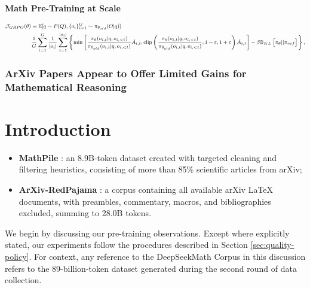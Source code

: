 \textbf{Math Pre-Training at Scale}

\begin{equation}
\footnotesize
\begin{split}
    \mathcal{J}_{GRPO}(\theta) &= \mathbb{E}{[q \sim P(Q), \{o_i\}_{i=1}^G \sim \pi_{\theta_{old}}(O|q)]}  \\
    & \frac{1}{G}\sum_{i=1}^G\frac{1}{|o_i|} \sum_{t=1}^{|o_i|} \left\{ \min \left[ \frac{\pi_\theta(o_{i,t} | q, o_{i,<t})}{\pi_{\theta_{old}}(o_{i,t} | q, o_{i,<t})} \hat{A}_{i,t}, \text{clip} \left( \frac{\pi_\theta(o_{i,t} | q, o_{i,<t})}{\pi_{\theta_{old}}(o_{i,t} | q, o_{i,<t})}, 1 - \varepsilon, 1 + \varepsilon \right)  \hat{A}_{i,t} \right] - \beta \mathbb{D}_{KL}\left[\pi_{\theta} || \pi_{ref}\right]\right\} ,
\end{split}
\label{eq:GRPO-obj}
\end{equation}

\subsubsection{ArXiv Papers Appear to Offer Limited Gains for Mathematical Reasoning}

\section{Introduction}

\begin{itemize}[topsep=0pt]
    \item \textbf{MathPile} \citep{mathpile}: an 8.9B-token dataset created with targeted cleaning and filtering heuristics, consisting of more than 85\% scientific articles from arXiv;
    \item \textbf{ArXiv-RedPajama} \citep{redpajama}: a corpus containing all available arXiv LaTeX documents, with preambles, commentary, macros, and bibliographies excluded, summing to 28.0B tokens.
\end{itemize}

We begin by discussing our pre-training observations. Except where explicitly stated, our experiments follow the procedures described in Section \ref{sec:quality-policy}. For context, any reference to the DeepSeekMath Corpus in this discussion refers to the 89-billion-token dataset generated during the second round of data collection.



